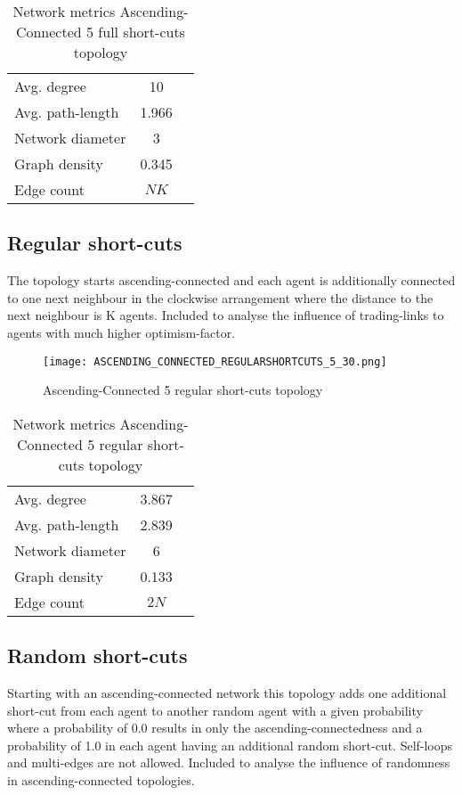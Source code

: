 \documentclass[Bachelorarbeit.tex]{subfiles}
\begin{document}
\begin{table}[H]
	\centering
	\caption{Network metrics Ascending-Connected 5 full short-cuts topology}
	\begin{tabular} { l c r }
		\hline
		Avg. degree & 10 \\
		Avg. path-length & 1.966 \\
		Network diameter & 3 \\
		Graph density & 0.345 \\
		Edge count & $NK$ \\
		\hline
	\end{tabular}
\end{table}

\pagebreak

\subsection{Regular short-cuts}
The topology starts ascending-connected and each agent is additionally connected to one next neighbour in the clockwise arrangement where the distance to the next neighbour is K agents. Included to analyse the influence of trading-links to agents with much higher optimism-factor.

\begin{figure}[H]
	\centering
  \texttt{[image: ASCENDING\_CONNECTED\_REGULARSHORTCUTS\_5\_30.png]}
	\caption{Ascending-Connected 5 regular short-cuts topology}
	\label{fig:topology_ASCENDING_CONNECTED_REGULARSHORTCUTS_5_30}
\end{figure}

\begin{table}[H]
	\centering
	\caption{Network metrics Ascending-Connected 5 regular short-cuts topology}
	\begin{tabular} { l c r }
		\hline
		Avg. degree & 3.867 \\
		Avg. path-length & 2.839 \\
		Network diameter & 6 \\
		Graph density & 0.133\\
		Edge count & $2N$ \\
		\hline
	\end{tabular}
\end{table}

\pagebreak

\subsection{Random short-cuts}
Starting with an ascending-connected network this topology adds one additional short-cut from each agent to another random agent with a given probability where a probability of 0.0 results in only the ascending-connectedness and a probability of 1.0 in each agent having an additional random short-cut. Self-loops and multi-edges are not allowed. Included to analyse the influence of randomness in ascending-connected topologies.
\end{document}
